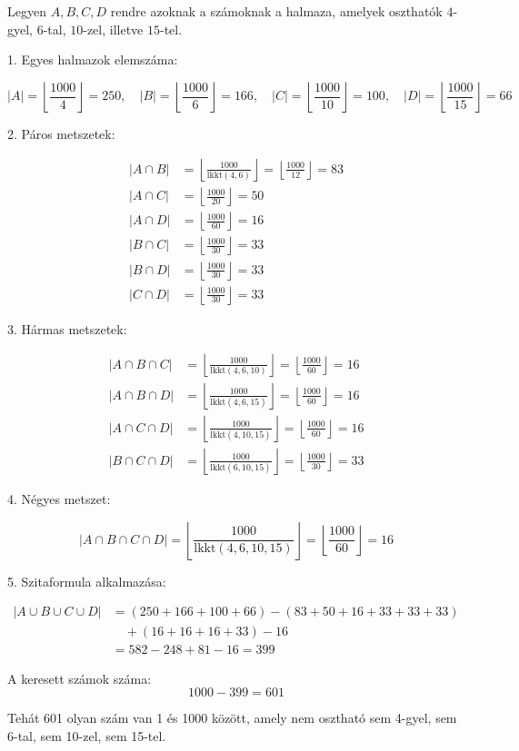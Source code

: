 \begin{solution}
Legyen $A,B,C,D$ rendre azoknak a számoknak a halmaza, amelyek oszthatók
$4$-gyel, $6$-tal, $10$-zel, illetve $15$-tel.

1. Egyes halmazok elemszáma:

\[
|A|=\left\lfloor \frac{1000}{4}\right\rfloor =250,\quad|B|=\left\lfloor \frac{1000}{6}\right\rfloor =166,\quad|C|=\left\lfloor \frac{1000}{10}\right\rfloor =100,\quad|D|=\left\lfloor \frac{1000}{15}\right\rfloor =66
\]

2. Páros metszetek:

\[
\begin{aligned}|A\cap B| & =\left\lfloor \frac{1000}{\mathrm{lkkt}(4,6)}\right\rfloor =\left\lfloor \frac{1000}{12}\right\rfloor =83\\
|A\cap C| & =\left\lfloor \frac{1000}{20}\right\rfloor =50\\
|A\cap D| & =\left\lfloor \frac{1000}{60}\right\rfloor =16\\
|B\cap C| & =\left\lfloor \frac{1000}{30}\right\rfloor =33\\
|B\cap D| & =\left\lfloor \frac{1000}{30}\right\rfloor =33\\
|C\cap D| & =\left\lfloor \frac{1000}{30}\right\rfloor =33
\end{aligned}
\]

3. Hármas metszetek:

\[
\begin{aligned}|A\cap B\cap C| & =\left\lfloor \frac{1000}{\mathrm{lkkt}(4,6,10)}\right\rfloor =\left\lfloor \frac{1000}{60}\right\rfloor =16\\
|A\cap B\cap D| & =\left\lfloor \frac{1000}{\mathrm{lkkt}(4,6,15)}\right\rfloor =\left\lfloor \frac{1000}{60}\right\rfloor =16\\
|A\cap C\cap D| & =\left\lfloor \frac{1000}{\mathrm{lkkt}(4,10,15)}\right\rfloor =\left\lfloor \frac{1000}{60}\right\rfloor =16\\
|B\cap C\cap D| & =\left\lfloor \frac{1000}{\mathrm{lkkt}(6,10,15)}\right\rfloor =\left\lfloor \frac{1000}{30}\right\rfloor =33
\end{aligned}
\]

4. Négyes metszet:

\[
|A\cap B\cap C\cap D|=\left\lfloor \frac{1000}{\mathrm{lkkt}(4,6,10,15)}\right\rfloor =\left\lfloor \frac{1000}{60}\right\rfloor =16
\]

5. Szitaformula alkalmazása:

\[
\begin{aligned}|A\cup B\cup C\cup D| & =(250+166+100+66)-(83+50+16+33+33+33)\\
 & \quad+(16+16+16+33)-16\\
 & =582-248+81-16=399
\end{aligned}
\]

A keresett számok száma: 
\[
1000-399=601
\]

Tehát 601 olyan szám van 1 és 1000 között, amely nem osztható sem
4-gyel, sem 6-tal, sem 10-zel, sem 15-tel. 
\end{solution}
